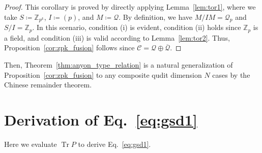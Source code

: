 \documentclass[aps,prb,english,superscriptaddress,twocolumn,tightenlines,showpacs,longbibliography,floatfix,amsfonts]{revtex4-2}
\newcommand{\tr}{\operatorname{Tr}}
\begin{document}
\begin{proof}
    This corollary is proved by directly applying Lemma~\ref{lem:tor1}, where we take $S\coloneqq\mathbb{Z}_{p^k}$, $I\coloneqq(p)$, and $M\coloneqq\mathcal{Q}$. By definition, we have $M/IM=\mathcal{Q}_p$ and $S/I=\mathbb{Z}_p$. In this scenario, condition (i) is evident, condition (ii) holds since $\mathbb{Z}_p$ is a field, and condition (iii) is valid according to Lemma~\ref{lem:tor2}. Thus, Proposition~\ref{cor:zpk_fusion} follows since $\mathcal{C}=\mathcal{Q}\oplus\overline{\mathcal{Q}}$.
\end{proof}

Then, Theorem~\ref{thm:anyon_type_relation} is a natural generalization of Proposition~\ref{cor:zpk_fusion} to any composite qudit dimension $N$ cases by the Chinese remainder theorem.

\section{Derivation of Eq.~\eqref{eq:gsd1}} \label{app4}
Here we evaluate $\tr P$ to derive Eq.~\eqref{eq:gsd1}. 
  
\end{document}
